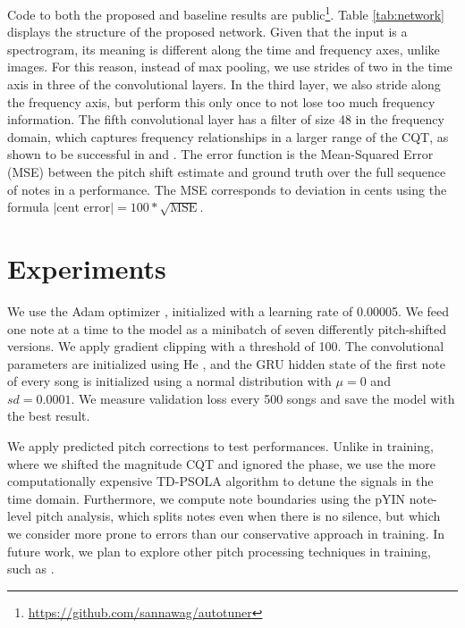 Code to both the proposed and baseline results are public\footnote{\href{https://github.com/sannawag/autotuner}{https://github.com/sannawag/autotuner}}. Table \ref{tab:network} displays the structure of the proposed network. Given that the input is a spectrogram, its meaning is different along the time and frequency axes, unlike images. For this reason, instead of max pooling, we use strides of two in the time axis in three of the convolutional layers. In the third layer, we also stride along the frequency axis, but perform this only once to not lose too much frequency information. The fifth convolutional layer has a filter of size 48 in the frequency domain, which captures frequency relationships in a larger range of the CQT, as shown to be successful in \cite{bittner2017deep} and \cite{hsu2017learning}. The error function is the Mean-Squared Error (MSE) between the pitch shift estimate and ground truth over the full sequence of notes in a performance. The MSE corresponds to deviation in cents using the formula $\left|\text{cent error}\right| = 100 * \sqrt{\text{MSE}}$.


\section{Experiments}
\label{sec:experiments-autotune}

We use the Adam optimizer \cite{kingma2014adam}, initialized with a learning rate of 0.00005. We feed one note at a time to the model as a minibatch of seven differently pitch-shifted versions. We apply gradient clipping \cite{pascanu2013difficulty} with a threshold of 100. The convolutional parameters are initialized using He \cite{he2015delving}, and the GRU hidden state of the first note of every song is initialized using a normal distribution with $\mu=0$ and $sd=0.0001$. We measure validation loss every 500 songs and save the model with the best result. 

We apply predicted pitch corrections to test performances. Unlike in training, where we shifted the magnitude CQT and ignored the phase, we use the more computationally expensive TD-PSOLA algorithm \cite{charpentier1986diphone} to detune the signals in the time domain. Furthermore, we compute note boundaries using the pYIN note-level pitch analysis, which splits notes even when there is no silence, but which we consider more prone to errors than our conservative approach in training. In future work, we plan to explore other pitch processing techniques in training, such as \cite{waloschek2018driftin}.



